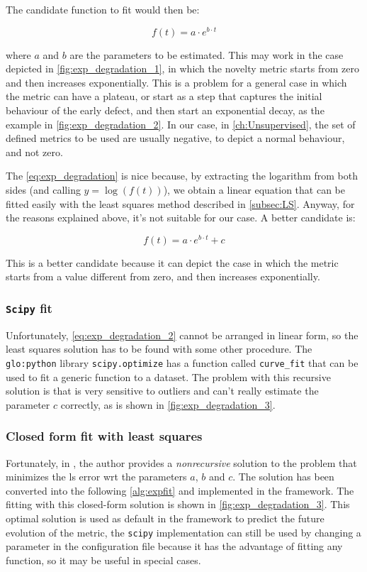 The candidate function to fit would then be:

\begin{equation}
    \label{eq:exp_degradation}
    f(t) = a \cdot e^{b \cdot t}
\end{equation}

where $a$ and $b$ are the parameters to be estimated. This may work in the case depicted in \autoref{fig:exp_degradation_1}, in which the novelty metric starts from zero and then increases exponentially. This is a problem for a general case in which the metric can have a plateau, or start as a step that captures the initial behaviour of the early defect, and then start an exponential decay, as the example in \autoref{fig:exp_degradation_2}. In our case, in \autoref{ch:Unsupervised}, the set of defined metrics to be used are usually negative, to depict a normal behaviour, and not zero. 

The \autoref{eq:exp_degradation} is nice because, by extracting the logarithm from both sides (and calling $y = \log(f(t))$), we obtain a linear equation that can be fitted easily with the least squares method described in \autoref{subsec:LS}. Anyway, for the reasons explained above, it's not suitable for our case. A better candidate is:

\begin{equation}
    \label{eq:exp_degradation_2}
    f(t) = a \cdot e^{b \cdot t} + c
\end{equation}

This is a better candidate because it can depict the case in which the metric starts from a value different from zero, and then increases exponentially.

\subsubsection{\texttt{Scipy} fit}
Unfortunately, \autoref{eq:exp_degradation_2} cannot be arranged in linear form, so the least squares solution has to be found with some other procedure. The \texttt{\gls{glo:python}} library \texttt{scipy.optimize} has a function called \texttt{curve\_fit} that can be used to fit a generic function to a dataset. The problem with this recursive solution is that is very sensitive to outliers and can't really estimate the parameter $c$ correctly, as is shown in \autoref{fig:exp_degradation_3}.

\subsubsection{Closed form fit with least squares}
Fortunately, in \cite{Exp_fit}, the author provides a \emph{nonrecursive} solution to the problem that minimizes the \gls{ls} error \gls{wrt} the parameters $a$, $b$ and $c$. The solution has been converted into the following \autoref{alg:expfit} and implemented in the framework. The fitting with this closed-form solution is shown in \autoref{fig:exp_degradation_3}. This optimal solution is used as default in the framework to predict the future evolution of the metric, the \texttt{scipy} implementation can still be used by changing a parameter in the configuration file because it has the advantage of fitting any function, so it may be useful in special cases.

